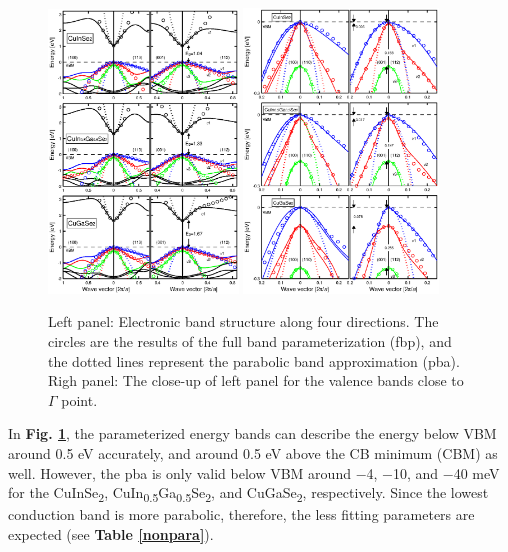 \documentclass[a4paper, 12pt, titlepage,oneside,drop]{kthesis}
\begin{document}
\begin{figure}[H]
    \begin{center}
            \includegraphics[width=0.45\textwidth,clip]{paper2figure1}
            \includegraphics[width=0.46\textwidth,clip]{paper2figure2}
     \end{center}
    \caption{ Left panel: Electronic band structure along four directions. The circles are the results of the full band parameterization (fbp), and the dotted lines represent the parabolic band approximation (pba). Righ panel: The 
              close-up of left panel for the valence bands close to $\Gamma$ point.}      
    \label{bandstruct}
\end{figure}

In \textbf{Fig. \ref{bandstruct}}, the parameterized energy bands can describe the energy below VBM around 0.5 eV accurately, and around 0.5 eV above the CB minimum (CBM) as well. However, the pba is only
valid below VBM around $-$4, $-$10, and $-$40 meV for the CuInSe\textsubscript2, CuIn\textsubscript{0.5}Ga\textsubscript{0.5}Se\textsubscript{2}, and CuGaSe\textsubscript{2}, respectively. Since the lowest conduction band
is more parabolic, therefore, the less fitting parameters are expected (see \textbf{Table \ref{nonpara}}).
\end{document}
